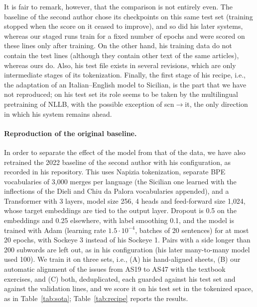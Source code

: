 \documentclass[11pt,a4paper]{article}
\begin{document}
It is fair to remark, however, that the comparison is not entirely even. The baseline of the
second author chose its checkpoints on this same test set (training stopped when the score on it
ceased to improve), and so did his later systems, whereas our staged runs train for
a fixed number of epochs and were scored on these lines only after training. On the other hand,
his training data do not contain the test lines (although they contain other text of the same articles), whereas ours do. Also, his test file exists in several revisions, which are only intermediate stages of its tokenization.
Finally, the first stage of his recipe, i.e., the adaptation of an Italian--English model to
Sicilian, is the part that we have not reproduced; on his test set its role seems to be taken by
the multilingual pretraining of NLLB, with the possible exception of scn$\rightarrow$it, the only
direction in which his system remains ahead.






\paragraph{Reproduction of the original baseline.}
In order to separate the effect of the model from that of the data, we have also retrained the
2022 baseline of the second author with his configuration, as recorded in his repository. This
uses Napizia tokenization, separate BPE vocabularies of 3{,}000 merges per language (the Sicilian one
learned with the inflections of the Dieli and Chiu da Palora vocabularies appended), and a
Transformer with 3 layers, model size 256, 4 heads and feed-forward size 1{,}024, whose target
embeddings are tied to the output layer. Dropout is 0.5 on the embeddings and 0.25 elsewhere,
with label smoothing 0.1, and the model is trained with Adam (learning rate $1.5\cdot 10^{-4}$,
batches of 20 sentences) for at most 20 epochs, with Sockeye 3 instead of his Sockeye 1. Pairs with a side longer than 200 subwords are left out, as in his configuration (his later many-to-many model used 100). We
train it on three sets, i.e., (A) his hand-aligned sheets, (B) our automatic alignment of the
issues from AS19 to AS47 with the textbook exercises, and (C) both, deduplicated, each guarded against
his test set and against the validation lines, and we score it on his test set in the tokenized
space, as in Table~\ref{tab:sota}; Table~\ref{tab:recipe} reports the results.
\end{document}
